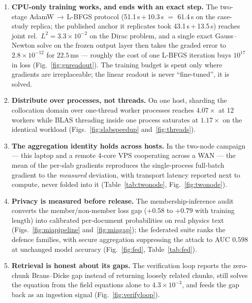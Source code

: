 \documentclass[11pt,a4paper]{article}
\theoremstyle{plain}
\theoremstyle{definition}
\begin{document}
\begin{enumerate}
    \item \textbf{CPU-only training works, and ends with an exact step.}
    The two-stage AdamW\,$\to$\,L-BFGS protocol (51.1\,s\,+\,10.3\,s
    $=$ 61.4\,s on the case-study replica; the published anchor it
    replicates took 43.1\,s\,+\,13.5\,s) reaches joint
    rel.\ $L^{2}=3.3\times10^{-2}$ on the
    Dirac problem, and a single exact Gauss--Newton solve on the frozen
    output layer then takes the graded error to $2.8\times10^{-12}$ for
    $22.5$\,ms --- roughly the cost of one L-BFGS iteration buys $10^{17}$
    in loss (Fig.~\ref{fig:gnreadout}). The training budget is spent only
    where gradients are irreplaceable; the linear readout is never
    ``fine-tuned'', it is solved.
    \item \textbf{Distribute over processes, not threads.} On one host,
    sharding the collocation domain over one-thread worker processes
    reaches $4.07\times$ at 12 workers while BLAS threading inside one
    process saturates at $1.17\times$ on the identical workload
    (Figs.~\ref{fig:slabspeedup} and~\ref{fig:threads}).
    \item \textbf{The aggregation identity holds across hosts.} In the
    two-node campaign --- this laptop and a remote 4-core VPS cooperating
    across a WAN --- the mean of the per-slab gradients reproduces the
    single-process full-batch gradient to the \emph{measured} deviation,
    with transport latency reported next to compute, never folded into it
    (Table~\ref{tab:twonode}, Fig.~\ref{fig:twonode}).
    \item \textbf{Privacy is measured before release.} The
    membership-inference audit converts the member/non-member loss gap
    ($+0.58$ to $+0.79$ with training length) into calibrated
    per-document probabilities on real physics text
    (Figs.~\ref{fig:miapipeline} and~\ref{fig:miagap}); the federated
    suite ranks the defence families, with secure aggregation
    suppressing the attack to AUC $0.598$ at unchanged model accuracy
    (Fig.~\ref{fig:fed}, Table~\ref{tab:fed}).
    \item \textbf{Retrieval is honest about its gaps.} The verification
    loop reports the zero-chunk Brans--Dicke gap instead of returning
    loosely related chunks, still solves the equation from the field
    equations alone to $4.3\times10^{-3}$, and feeds the gap back as an
    ingestion signal (Fig.~\ref{fig:verifyloop}).
\end{enumerate}
\end{document}
